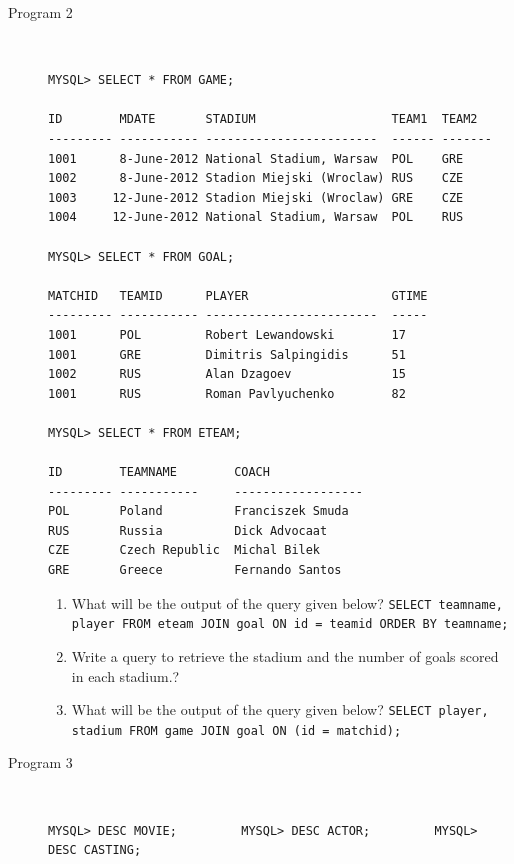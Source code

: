 \documentclass[11pt,a4paper]{article}
\def\AnswerBox{\fbox{\begin{minipage}{4in}\hfill\vspace{0.5in}\end{minipage}}}
\begin{document}
\begin{description}
\begin{enumerate}[label=\bfseries Q\arabic*:]
\end{enumerate}

\item[Program 2]\
\begin{verbatim}
MYSQL> SELECT * FROM GAME;

ID        MDATE       STADIUM                   TEAM1  TEAM2
--------- ----------- ------------------------  ------ -------
1001      8-June-2012 National Stadium, Warsaw  POL    GRE
1002      8-June-2012 Stadion Miejski (Wroclaw) RUS    CZE
1003     12-June-2012 Stadion Miejski (Wroclaw) GRE    CZE
1004     12-June-2012 National Stadium, Warsaw	POL    RUS

MYSQL> SELECT * FROM GOAL;

MATCHID   TEAMID      PLAYER                    GTIME
--------- ----------- ------------------------  -----
1001      POL         Robert Lewandowski        17
1001      GRE         Dimitris Salpingidis      51
1002      RUS         Alan Dzagoev              15
1001      RUS         Roman Pavlyuchenko        82

MYSQL> SELECT * FROM ETEAM;

ID        TEAMNAME        COACH                   
--------- -----------     ------------------
POL       Poland          Franciszek Smuda
RUS       Russia          Dick Advocaat
CZE       Czech Republic  Michal Bilek
GRE       Greece          Fernando Santos
\end{verbatim}


\begin{enumerate}[label=\bfseries Q\arabic*:]\itemsep10pt

\item What will be the output of the query given below?\newline
\texttt{SELECT teamname, player FROM eteam JOIN goal ON id = teamid ORDER BY teamname;}
\item Write a query to retrieve the stadium and the number of goals scored in each stadium.?
\item What will be the output of the query given below?\newline
\texttt{SELECT player, stadium FROM game JOIN goal ON (id = matchid);}
\end{enumerate}
\item [Program 3]\ 
\begin{verbatim}
MYSQL> DESC MOVIE;         MYSQL> DESC ACTOR;         MYSQL> DESC CASTING;
                                                                          

\end{verbatim}
\end{description}
\end{document}

